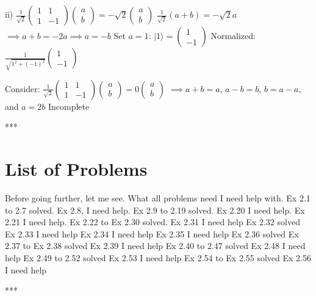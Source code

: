 \documentclass{article}
\newcommand{\0}{{$|0\rangle$}}
\newcommand{\1}{{$|1\rangle$}}
\begin{document}
ii) $\frac{1}{\sqrt{2}} \begin{pmatrix} 1 & 1 \\ 1 & -1 \end{pmatrix}\begin{pmatrix} a \\ b \end{pmatrix} = -\sqrt{2} \begin{pmatrix} a \\ b \end{pmatrix}$  
$\frac{1}{\sqrt{2}}(a+b) = -\sqrt{2} a$  
$\implies a+b=-2a \implies a=-b$  
Set $a=1$: $|1\rangle = \begin{pmatrix} 1 \\ -1 \end{pmatrix}$  
Normalized: $\frac{1}{\sqrt{1^2 + (-1)^2}} \begin{pmatrix} 1 \\ -1 \end{pmatrix}$

Consider: $\frac{1}{\sqrt{2}}\begin{pmatrix} 1 & 1 \\ 1 & -1 \end{pmatrix} \begin{pmatrix} a \\ b \end{pmatrix} = 0 \begin{pmatrix} a \\ b \end{pmatrix}$  
$\implies a+b=a$, $a-b=b$, $b=a-a$, and $a=2b$  Incomplete  

***

\section{List of Problems}

Before going further, let me see. What all problems need I need help with.  
Ex 2.1 to 2.7 solved.  
Ex 2.8, I need help.  
Ex 2.9 to 2.19 solved.  
Ex 2.20 I need help.  
Ex 2.21 I need help.  
Ex 2.22 to Ex 2.30 solved.  
Ex 2.31 I need help  
Ex 2.32 solved  
Ex 2.33 I need help  
Ex 2.34 I need help  
Ex 2.35 I need help  
Ex 2.36 solved  
Ex 2.37 to Ex 2.38 solved  
Ex 2.39 I need help  
Ex 2.40 to 2.47 solved  
Ex 2.48 I need help  
Ex 2.49 to 2.52 solved  
Ex 2.53 I need help  
Ex 2.54 to Ex 2.55 solved  
Ex 2.56 I need help

***
\end{document}
